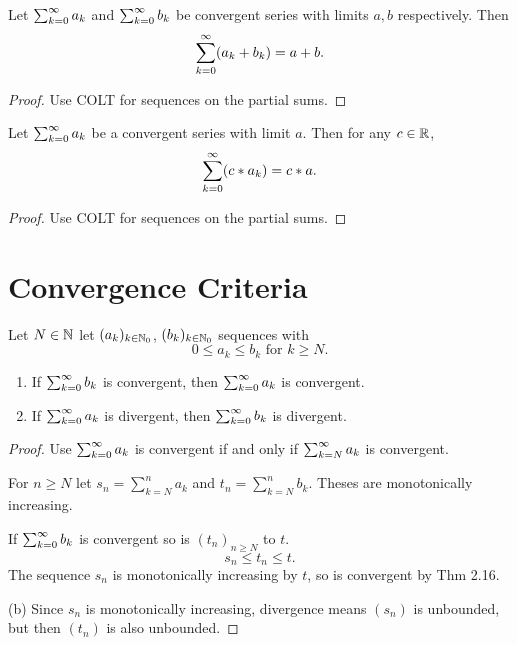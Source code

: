 \begin{theorem}\label{thm:sum_COLT_add}
    Let $\infsumo a_k$ and $\infsumo b_k$ be convergent series with limits $a, b$ respectively.
    Then
    \[
    \infsumo (a_k + b_k) = a + b.
    \]
\end{theorem}
\begin{proof}
    Use COLT for sequences on the partial sums.
\end{proof}

\begin{theorem}\label{thm:sum_COLT_scalarmult}
    Let $\infsumo a_k$ be a convergent series with limit $a$.
    Then for any $c \in \R$,
    \[
    \infsumo (c * a_k) = c * a.
    \]
\end{theorem}
\begin{proof}
    Use COLT for sequences on the partial sums.
\end{proof}

\section{Convergence Criteria}

\begin{theorem}\label{thm:sum_comptest}
    Let $N \in \N$ let $(a_k)_{k \in \N_0}$, $(b_k)_{k \in \N_0}$ sequences with
    \[
    0 \leq a_k \leq b_k \text{ for } k \geq N.
    \]
    \begin{enumerate}[label = (\alph*)]
        \item If $\infsum[k = 0]b_k$ is convergent,
        then $\infsum[k = 0]a_k$ is convergent.
        \item If $\infsum[k = 0]a_k$ is divergent,
        then $\infsum[k = 0]b_k$ is divergent.
    \end{enumerate}
\end{theorem}
\begin{proof}
    Use $\infsum[k = 0]a_k$ is convergent if and only if $\infsum[k = N]a_k$ is convergent.

    For $n \geq N$ let $s_n = \sum_{k = N}^{n}a_k$ and $t_n = \sum_{k = N}^{n}b_k$.
    Theses are monotonically increasing.

    If $\infsum[k = 0]b_k$ is convergent so is $(t_n)_{n \geq N}$ to $t$.
    \[
    s_n \leq t_n \leq t.
    \]
    The sequence $s_n$ is monotonically increasing by $t$,
    so is convergent by Thm 2.16.

    (b)
    Since $s_n$ is monotonically increasing,
    divergence means $(s_n)$ is unbounded,
    but then $(t_n)$ is also unbounded.
\end{proof}

